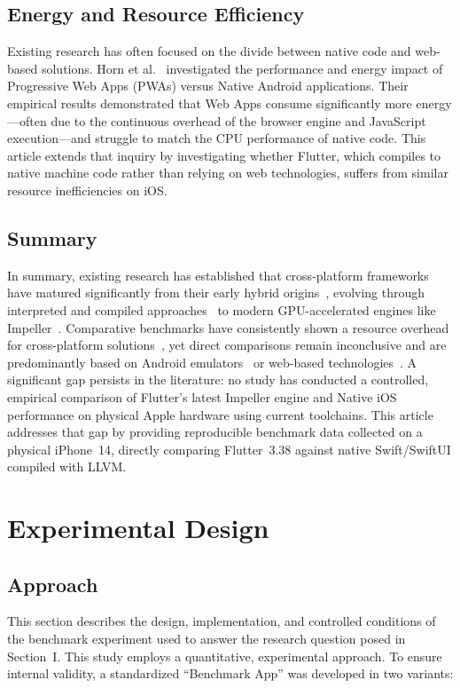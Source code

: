 \documentclass[journal]{IEEEtran}
\begin{document}
\subsection{Energy and Resource Efficiency}
Existing research has often focused on the divide between native code and web-based solutions. Horn et
al.~\cite{horn2023} investigated the performance and energy impact of Progressive Web Apps (PWAs) versus
Native Android applications. Their empirical results demonstrated that Web Apps consume significantly
more energy---often due to the continuous overhead of the browser engine and JavaScript execution---and
struggle to match the CPU performance of native code. This article extends that inquiry by investigating
whether Flutter, which compiles to native machine code rather than relying on web technologies, suffers
from similar resource inefficiencies on iOS.

\subsection{Summary}
In summary, existing research has established that cross-platform frameworks have matured significantly from their early hybrid origins~\cite{majchrzak2017, bjornhansen2020}, evolving through interpreted and compiled approaches~\cite{bjornhansen2018} to modern GPU-accelerated engines like Impeller~\cite{impeller2024}. Comparative benchmarks have consistently shown a resource overhead for cross-platform solutions~\cite{nawrocki2021, pinto2021}, yet direct comparisons remain inconclusive and are predominantly based on Android emulators~\cite{you2021} or web-based technologies~\cite{horn2023}. A significant gap persists in the literature: no study has conducted a controlled, empirical comparison of Flutter's latest Impeller engine and Native iOS performance on physical Apple hardware using current toolchains. This article addresses that gap by providing reproducible benchmark data collected on a physical iPhone~14, directly comparing Flutter~3.38 against native Swift/SwiftUI compiled with LLVM.

\section{Experimental Design}
\subsection{Approach}
This section describes the design, implementation, and controlled conditions of the benchmark experiment used to answer the research question posed in Section~I.
This study employs a quantitative, experimental approach. To ensure internal validity, a standardized
``Benchmark App'' was developed in two variants:
\end{document}
